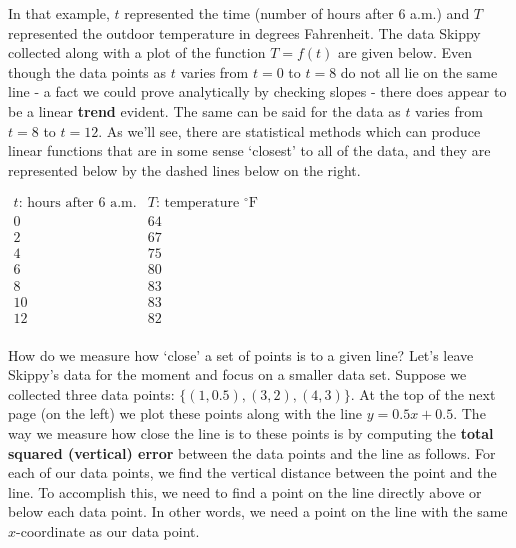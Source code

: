\documentclass{ximera}
\begin{document}
In that example, $t$ represented the time (number of hours after 6 a.m.) and $T$ represented the outdoor temperature in degrees Fahrenheit. The data Skippy collected along with a plot of the function $T = f(t)$ are given below. Even though the data points as $t$ varies from $t = 0$ to $t = 8$ do not all lie on the same line - a fact we could prove analytically by checking slopes - there does appear to be a linear \textbf{trend} evident.  The same can be said for the data as $t$ varies from $t =8 $ to $t = 12$.  As we'll see, there are statistical methods which can produce  linear functions that are in some sense `closest' to all of the data, and they are represented below by the dashed lines below on the right. 

\begin{center}
$\begin{array}{|c||c|}  \hline

 \text{$t$: hours after 6 a.m.}  & \text{$T$: temperature $^{\circ}$F} \\ \hline
 0 & 64  \\
 2 & 67  \\
 4 &  75  \\
 6 &  80 \\
 8 & 83  \\
 10 &  83 \\
 12 & 82  \\
\end{array}$
\end{center}

\begin{center}
\end{center}


How do we measure how `close' a set of points is to a given line?   Let's leave Skippy's data for the moment and focus on a smaller data set.  Suppose we collected three data points: $\{(1, 0.5), (3, 2), (4, 3)\}$.  At the top of the next page (on the left) we plot these points along with the line $y = 0.5 x + 0.5$.   The way we measure how close the line is to these points is by computing the \textbf{total squared (vertical) error} between the data points and the line as follows.   For each of our data points, we find the vertical distance between the point and the line.  To accomplish this, we need to find a point on the line directly above or below each data point.  In other words, we need a point on the line with the same $x$-coordinate as our data point.  
\end{document}

